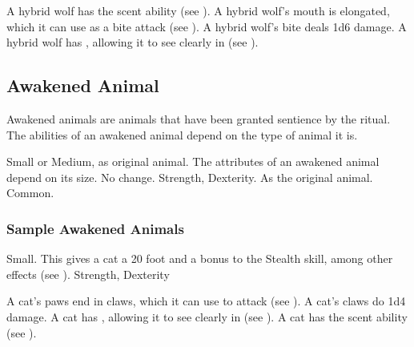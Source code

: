 
            \begin{itemize}
                 A hybrid wolf has the scent ability (see ).
                 A hybrid wolf's mouth is elongated, which it can use as a bite attack (see ).
                    A hybrid wolf's bite deals 1d6 damage.
                 A hybrid wolf has , allowing it to see clearly in  (see ).
            \end{itemize}

    \subsection{Awakened Animal}

        Awakened animals are animals that have been granted sentience by the  ritual.
        The abilities of an awakened animal depend on the type of animal it is.

         Small or Medium, as original animal.
         The attributes of an awakened animal depend on its size.
         No change.
          Strength,  Dexterity.
         As the original animal.
         Common.

        \subsubsection{Sample Awakened Animals}


             Small. This gives a cat a 20 foot  and a  bonus to the Stealth skill, among other effects (see ).
              Strength,  Dexterity
            \begin{itemize}
                 A cat's paws end in claws, which it can use to attack (see ). A cat's claws do 1d4 damage.
                 A cat has , allowing it to see clearly in  (see ).
                 A cat has the scent ability (see ).
            \end{itemize}

